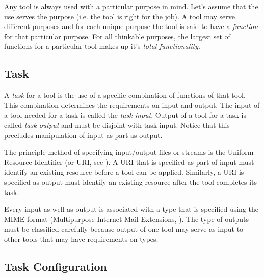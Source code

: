 \documentclass{article}
\begin{document}
   Any tool is always used with a particular purpose in mind. Let's assume that
   the use serves the purpose (i.e. the tool is right for the job). A tool may
   serve different purposes and for each unique purpose the tool is said to
   have a \emph{function} for that particular purpose. For all thinkable
   purposes, the largest set of functions for a particular tool makes up it's
   \textit{total functionality}.


  \subsection{Task}

   A \textit{task} for a tool is the use of a specific combination of functions
   of that tool. This combination determines the requirements on input and
   output. The input of a tool needed for a task is called the \textit{task
   input}.  Output of a tool for a task is called \textit{task output} and must
   be disjoint with task input. Notice that this precludes manipulation of
   input as part as output. 

   The principle method of specifying input/output files or streams is the
   Uniform Resource Identifier (or URI, see \cite{rfc3305}). A URI that is
   specified as part of input must identify an existing resource before a tool
   can be applied. Similarly, a URI is specified as output must identify an
   existing resource after the tool completes its task.

   Every input as well as output is associated with a type that is specified
   using the MIME format (Multipurpose Internet Mail Extensions, \cite{rfc2822}).
   The type of outputs must be classified carefully because output of one tool
   may serve as input to other tools that may have requirements on types.

  \subsection{Task Configuration} \label{concepts::task_configuration}

   
\end{document}
